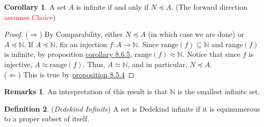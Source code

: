 \documentclass[14pt]{article}
\theoremstyle{definition}
\newtheorem*{remark}{Remarks}
\newtheorem{definition}{Definition}[subsection]
\newtheorem{coro}[definition]{Corollary}
\newcommand{\fun}[3]{#1\colon #2\rightarrow#3}
\newcommand{\bb}[1]{\mathbb{#1}}
\begin{document}
\vspace{2mm}

\hypertarget{Corollary 8.10.6}{\begin{coro}
    A set $A$ is infinite if and only if $N\preceq A$. (The forward direction \textcolor{red}{assumes Choice})
\end{coro}}
\begin{proof}
    ($\Rightarrow$) By Comparability, either $N\preceq A$ (in which case we are done)
    or $A \preceq \bb{N}$. If $A \preceq \bb{N}$, fix an injection $\fun{f}{A}{\bb{N}}$.
    Since $\mathrm{range}(f)\subseteq \bb{N}$ and $\mathrm{range}(f)$ is infinite, by 
    proposition \hyperlink{Corollary 8.6.5}{corollary 8.6.5}, $\mathrm{range}(f)\approx \bb{N}$.
    Notice that since $f$ is injective, $A\approx \mathrm{range}(f)$.
    Thus, $A\approx \bb{N}$, and in particular, $N\preceq A$.\\
    ($\Leftarrow$) This is true by \hyperlink{proposition 8.5.4}{proposition 8.5.4}
\end{proof}


\begin{remark}
    An interpretation of this result is that $\bb{N}$ is the smallest infinite set.
\end{remark}

\vspace{2mm}

\begin{definition}
    (\textit{Dedekind Infinite}) A set is Dedekind infinite if it is equinumerous to a proper subset of itself.
\end{definition}

\vspace{2mm}
\end{document}
